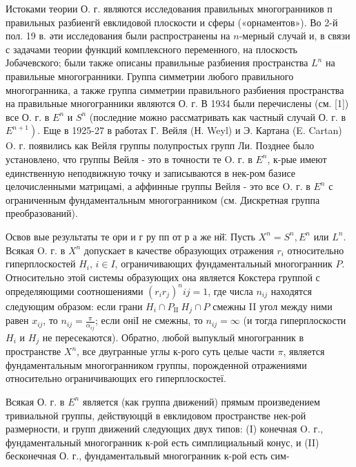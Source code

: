 \documentclass[10pt]{article}
\begin{document}
Истоками теории О. г. являются исследования правильных многогранников п правильных разбиенгй евклидовой плоскости и сферы («орнаментов»). Во 2-й пол. 19 в. әти исследования были распространены на $n$-мерный случай и, в связи с задачами теории функций комплексного переменного, на плоскость Јобачевского; были также описаны правильные разбиения пространства $L^{n}$ на правильные многогранники. Группа симметрии любого правильного многогранника, а также группа симметрии правильного разбиения пространства на правильные многогранники являются О. г. В 1934 были перечислены (см. [1]) все О. г. в $E^{n}$ и $S^{n}$ (последние можно рассматривать как частный случай $О$. г. в $\left.E^{n+1}\right)$. Еще в 1925-27 в работах Г. Вейля (Н. Weyl) и Э. Картана (E. Cartan) O. г. появились как Вейля группы полупростых групп Ли. Позднее было установлено, что группы Вейля - это в точности те O. г. в $E^{n}$, к-рые имеют единственную неподвижную точку и записываются в нек-ром базисе целочисленными матрицамі, а аффинные группы Вейля - это все O. г. в $E^{n}$ с ограниченным фундаментальным многогранником (см. Дискретная группа преобразований).

Освов вые результаты те ори и г ру пп от р а же нй̈. Пусть $X^{n}=S^{n}, E^{n}$ или $L^{n}$. Всякая O. г. в $X^{n}$ допускает в качестве образующих отражения $r_{i}$ относительно гиперплоскостей $H_{i}$, $i \in I$, ограничивающих фундаментальный многогранник $P$. Относительно этой системы образующих она является Кокстера группой с определяющими соотношениями $\left(r_{i} r_{j}\right)^{n} i j=1$, где числа $n_{i j}$ находятся следующим образом: если грани $H_{i} \cap P_{\text {II }} H_{j} \cap P$ смежны II угол между ними равен $x_{i j}$, то $n_{i j}=\frac{\pi}{\alpha_{i j}}$; если оніІ не смежны, то $n_{i j}=\infty$ (и тогда гиперплоскости $H_{i}$ и $H_{j}$ не пересекаются). Обратно, любой выпуклый многогранник в пространстве $X^{n}$, все двугранные углы к-рого суть целые части $\pi$, является фундаментальным многогранником группы, порожденной отражениями относительно ограничивающих его гиперплоскостеї.

Всякая О. г. в $E^{n}$ является (как группа движений) прямым произведением тривиальной группы, действуюццй в евклидовом пространстве нек-рой размерности, и групп движений следующих двух типов: (I) конечная O. г., фундаментальный многогранник к-рой есть симплициальный конус, и (II) бесконечная О. г., фундаментальвый многогранник к-рой есть сим-
\end{document}
